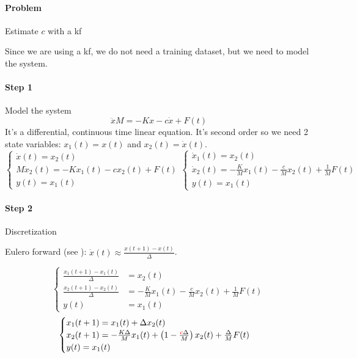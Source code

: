 \begin{exa}
    \paragraph{Problem} Estimate $c$ with a \gls{kf}

    Since we are using a \gls{kf}, we do not need a training dataset, but we need to model the system.

    \paragraph{Step 1} Model the system
    \[
        \ddot{x}M = -Kx - c\dot{x} + F(t)
    \]
    It's a differential, continuous time linear equation.
    It's second order so we need 2 state variables: $x_1(t) = x(t)$ and $x_2(t) = \dot{x}(t)$.
    \[
        \begin{cases}
            \dot{x}(t) = x_2(t) \\
            M\dot{x}_2(t) = -Kx_1(t) -cx_2(t) + F(t) \\
            y(t) = x_1(t)
        \end{cases}
        \begin{cases}
            \dot{x}_1(t) = x_2(t) \\
            \dot{x}_2(t) = -\frac{K}{M} x_1(t) - \frac{c}{M} x_2(t) + \frac{1}{M}F(t) \\
            y(t) = x_1(t)
        \end{cases}
    \]

    \paragraph{Step 2} Discretization

    Eulero forward (see ): $\dot{x}(t) \approx \frac{x(t+1)-x(t)}{\Delta}$.

    \[
        \begin{cases}
            \frac{x_1(t+1)-x_1(t)}{\Delta} &= x_2(t) \\
            \frac{x_2(t+1)-x_2(t)}{\Delta} &= -\frac{K}{M} x_1(t) - \frac{c}{M} x_2(t) + \frac{1}{M}F(t) \\
            y(t) &= x_1(t)
        \end{cases}
    \]
    \[
        \begin{cases}
            x_1(t+1) = x_1(t) + \Delta x_2(t) \\
            x_2(t+1) = -\frac{K\Delta}{M}x_1(t) + \left(1-\frac{{\color{red}c}\Delta}{M}\right)x_2(t) + \frac{\Delta}{M}F(t) \\
            y(t) = x_1(t)
        \end{cases}
    \]


\end{exa}
